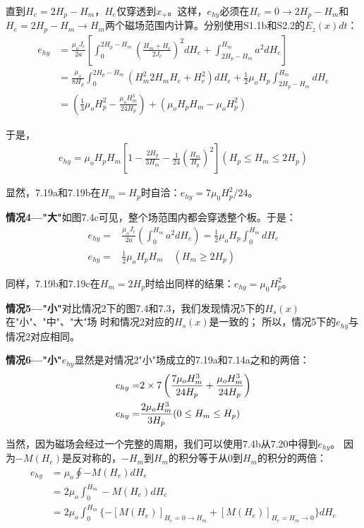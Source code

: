 直到$H_e=2H_p-H_m$，$H_e$仅穿透到$x_+$。这样，$e_{hy}$必须在$H_e=0\rightarrow 2H_p-H_m$和
$H_e=2H_p-H_m\rightarrow H_m$两个磁场范围内计算。分别使用S1.1b和S2.2的$E_z(x)dt$：
\begin{align*}%
e_{hy}&=\frac{\mu_oJ_c}{2a}\left[\int_{0}^{2H_p-H_m}\left(\frac{H_m+H_e}{2J_c}\right)^2dH_e+\int_{2H_p-H_m}^{H_m}a^2dH_e\right] \\
&=\frac{\mu_o}{8H_p}\int_{0}^{2H_p-H_m}(H_{m}^{2}2H_mH_e+H_{e}^{2})dH_e+\frac{1}{2}\mu_oH_p\int_{2H_p-H_m}^{H_m}dH_e \\
&=\left(\frac{1}{3}\mu_oH_{p}^{2}-\frac{\mu_oH_{m}^{3}}{24H_p}\right)+(\mu_oH_pH_m-\mu_oH_{p}^{2}) 
\end{align*}

于是，
\begin{align*}
e_{hy}=\mu_oH_pH_m\left[1-\frac{2H_p}{3H_m}-\frac{1}{24}\left(\frac{H_m}{H_p}\right)^2\right]      (H_p\leq H_m\leq 2H_p)
\end{align*}

显然，7.19a和7.19b在$H_m=H_p$时自洽：$e_{hy}=7\mu_0 H_p^2/24$。

\textbf{情况4---"大"}\quad 如图7.4c可见，整个场范围内都会穿透整个板。于是：
\begin{align*}%
e_{hy}=&\frac{\mu_oJ_c}{2a}\left(\int_{0}^{H_m}a^2dH_e\right)=\frac{1}{2}\mu_oH_p\int_{0}^{H_m}dH_e\\
e_{hy}=&\frac{1}{2}\mu_oH_pH_m \quad (H_m\geq 2H_p) \tag{7.19c}
\end{align*}

同样，7.19b和7.19c在$H_m=2H_p$时给出同样的结果：$e_{hy}=\mu_0 H_p^2$。

\textbf{情况5---"小"}\quad 对比情况2下的图7.4和7.3，我们发现情况5下的$H_s(x)$在"小"、"中"、"大"场
时和情况2对应的$H_s(x)$是一致的；
所以，情况5下的$e_{hy}$与情况2对应相同。

\textbf{情况6---"小"}\quad $e_{hy}$显然是对情况2"小"场成立的7.19a和7.14a之和的两倍：
\begin{align}%
e_{hy}=&2\times7\left(\frac{7\mu_oH_{m}^{3}}{24H_p}+\frac{\mu_oH_{m}^{3}}{24H_p}\right)\\\notag
e_{hy}=&\frac{2\mu_oH_{m}^{3}}{3H_p}     (0\leq H_m\leq H_p)
\end{align}

当然，因为磁场会经过一个完整的周期，我们可以使用7.4b从7.20中得到$e_{hy}$。
因为$-M(H_e)$是反对称的，$-H_m$到$H_m$的积分等于从0到$H_m$的积分的两倍：
\begin{align*}%
e_{hy}&=\mu_o\oint-M(H_e)dH_e \\
&=2\mu_o\int_{0}^{H_m}-M(H_e)dH_e\\ 
&=2\mu_o\int_{0}^{H_m}\{-[M(H_e)]_{H_e=0\rightarrow H_m}+[M(H_e)]_{H_e=H_m\rightarrow 0}\}dH_e \tag{7.21}
\end{align*}

